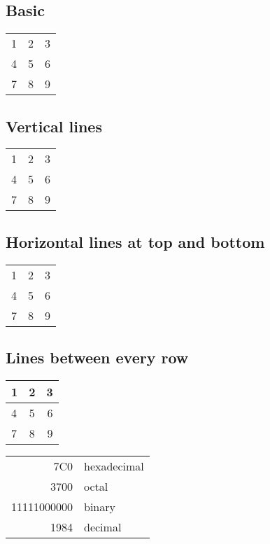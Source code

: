 \documentclass{article}
\begin{document}

  \subsection{Basic}

  \begin{tabular}{ l c r }
    1 & 2 & 3 \\
    4 & 5 & 6 \\
    7 & 8 & 9 \\
  \end{tabular}

  \subsection{Vertical lines}

  \begin{tabular}{ l | c | r }
    1 & 2 & 3 \\
    4 & 5 & 6 \\
    7 & 8 & 9 \\
  \end{tabular}

  \subsection{Horizontal lines at top and bottom}

  \begin{tabular}{ l | c | r }
    \hline
    1 & 2 & 3 \\
    4 & 5 & 6 \\
    7 & 8 & 9 \\
    \hline
  \end{tabular}

  \subsection{Lines between every row}

  \begin{center}
    \begin{tabular}{ l | c | r }
      \hline
      1 & 2 & 3 \\ \hline
      4 & 5 & 6 \\ \hline
      7 & 8 & 9 \\
      \hline
    \end{tabular}
  \end{center}

  \begin{tabular}{|r|l|}
    \hline
    7C0 & hexadecimal \\
    3700 & octal \\ \cline{2-2}
    11111000000 & binary \\
    \hline \hline
    1984 & decimal \\
    \hline
  \end{tabular}
\end{document}
